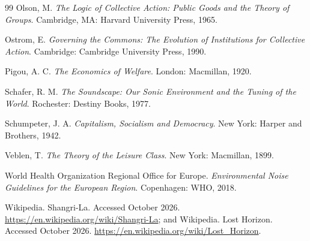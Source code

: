 \documentclass[11pt]{article}
\theoremstyle{definition}
\theoremstyle{remark}
\begin{document}
\begin{thebibliography}{99}
Olson, M. \emph{The Logic of Collective Action: Public Goods and the Theory of Groups}. Cambridge, MA: Harvard University Press, 1965.

Ostrom, E. \emph{Governing the Commons: The Evolution of Institutions for Collective Action}. Cambridge: Cambridge University Press, 1990.

Pigou, A. C. \emph{The Economics of Welfare}. London: Macmillan, 1920.

Schafer, R. M. \emph{The Soundscape: Our Sonic Environment and the Tuning of the World}. Rochester: Destiny Books, 1977.

Schumpeter, J. A. \emph{Capitalism, Socialism and Democracy}. New York: Harper and Brothers, 1942.

Veblen, T. \emph{The Theory of the Leisure Class}. New York: Macmillan, 1899.

World Health Organization Regional Office for Europe. \emph{Environmental Noise Guidelines for the European Region}. Copenhagen: WHO, 2018.

Wikipedia. Shangri-La. Accessed October 2026. \url{https://en.wikipedia.org/wiki/Shangri-La}; and Wikipedia. Lost Horizon. Accessed October 2026. \url{https://en.wikipedia.org/wiki/Lost_Horizon}.

\end{thebibliography}
\end{document}
